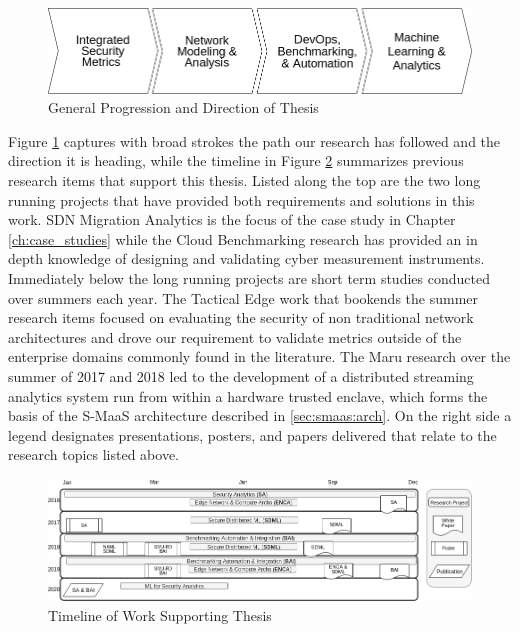 \begin{figure}[ht]
\centering
\includegraphics[width=\textwidth]{resource/img/ch_future/timeline_broad.png}
\caption{General Progression and Direction of Thesis}
\label{fig:future:timeline_broad}
\end{figure} 

Figure \ref{fig:future:timeline_broad} captures with broad strokes the path our research has followed and the direction it is heading, while the timeline in Figure \ref{fig:future:timeline_detail} summarizes previous research items that support this thesis. Listed along the top are the two long running projects that have provided both requirements and solutions in this work. SDN Migration Analytics is the focus of the case study in Chapter \ref{ch:case_studies} while the Cloud Benchmarking research has provided an in depth knowledge of designing and validating cyber measurement instruments. Immediately below the long running projects are short term studies conducted over summers each year. The Tactical Edge work that bookends the summer research items focused on evaluating the security of non traditional network architectures and drove our requirement to validate metrics outside of the enterprise domains commonly found in the literature. The Maru research over the summer of 2017 and 2018 led to the development of a distributed streaming analytics system run from within a hardware trusted enclave, which forms the basis of the S-MaaS architecture described in \ref{sec:smaas:arch}. On the right side a legend designates presentations, posters, and papers delivered that relate to the research topics listed above.


\begin{figure}[ht]
\centering
\includegraphics[width=\textwidth]{resource/img/ch_future/timeline.png}
\caption{Timeline of Work Supporting Thesis }
\label{fig:future:timeline_detail}
\end{figure} 

